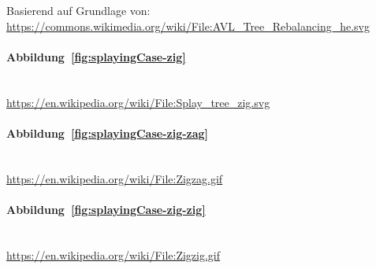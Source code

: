 \documentclass[a4paper]{article}
\begin{document}
    Basierend auf Grundlage von:\\
    \url{https://commons.wikimedia.org/wiki/File:AVL_Tree_Rebalancing_he.svg}

    \paragraph{Abbildung~\ref{fig:splayingCase-zig}}\mbox{}\\

    \url{https://en.wikipedia.org/wiki/File:Splay_tree_zig.svg}

    \paragraph{Abbildung~\ref{fig:splayingCase-zig-zag}}\mbox{}\\

    \url{https://en.wikipedia.org/wiki/File:Zigzag.gif}

    \paragraph{Abbildung~\ref{fig:splayingCase-zig-zig}}\mbox{}\\

    \url{https://en.wikipedia.org/wiki/File:Zigzig.gif}

    
\end{document}
